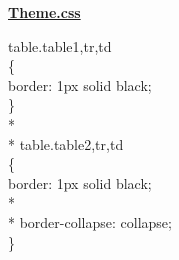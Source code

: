 \begin{center}
{\Huge \bf\underline{{{Theme.css}}}\vskip 0.2in}
\end{center}
table.table1,tr,td\\
\{\\
border: 1px solid black;\\
\}\\* \\*
table.table2,tr,td\\
\{\\
border: 1px solid black;\\* \\*
border-collapse: collapse;\\
\}\\



















































































